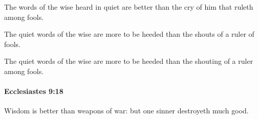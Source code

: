 			\begin{versebox}
					\item[BHS] 
					\item[LXX] 
					\item[ASV] The words of the wise heard in quiet are better than the cry of him that ruleth among fools.
					\item[NIV] The quiet words of the wise are more to be heeded than the shouts of a ruler of fools.
					\item[NRSV] The quiet words of the wise are more to be heeded than the shouting of a ruler among fools.
			\end{versebox}

		\paragraph{Ecclesiastes 9:18} %
			\label{ECCLESIASTES-9-18}

			Wisdom is better than weapons of war: but one sinner destroyeth much good.

